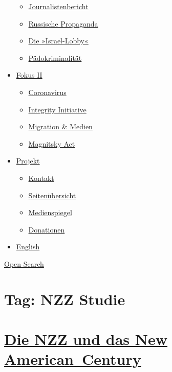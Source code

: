 \begin{itemize}
  \begin{itemize}
  \tightlist
  \item
    \href{https://swprs.org/bericht-eines-journalisten/}{Journalistenbericht}
  \item
    \href{https://swprs.org/russische-propaganda/}{Russische Propaganda}
  \item
    \href{https://swprs.org/die-israel-lobby-fakten-und-mythen/}{Die
    »Israel-Lobby«}
  \item
    \href{https://swprs.org/geopolitik-und-paedokriminalitaet/}{Pädokriminalität}
  \end{itemize}
\item
  \href{https://swprs.org/migration-und-medien/}{Fokus II}

  \begin{itemize}
  \tightlist
  \item
    \href{https://swprs.org/covid-19-hinweis-ii/}{Coronavirus}
  \item
    \href{https://swprs.org/die-integrity-initiative/}{Integrity
    Initiative}
  \item
    \href{https://swprs.org/migration-und-medien/}{Migration \& Medien}
  \item
    \href{https://swprs.org/der-fall-magnitsky/}{Magnitsky Act}
  \end{itemize}
\item
  \href{https://swprs.org/kontakt/}{Projekt}

  \begin{itemize}
  \tightlist
  \item
    \href{https://swprs.org/kontakt/}{Kontakt}
  \item
    \href{https://swprs.org/uebersicht/}{Seitenübersicht}
  \item
    \href{https://swprs.org/medienspiegel/}{Medienspiegel}
  \item
    \href{https://swprs.org/donationen/}{Donationen}
  \end{itemize}
\item
  \href{https://swprs.org/contact/}{English}
\end{itemize}

\protect\hyperlink{}{Open Search}

\hypertarget{tag-nzz-studie}{%
\section{Tag: NZZ Studie}\label{tag-nzz-studie}}

\hypertarget{die-nzz-und-das-new-american-century}{%
\section{\texorpdfstring{\href{https://swprs.org/2017/03/01/nzz-new-american-century/}{Die
NZZ und das New
American~Century}}{Die NZZ und das New American~Century}}\label{die-nzz-und-das-new-american-century}}

